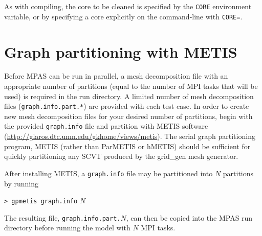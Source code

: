 As with compiling, the core to be cleaned is specified by the {\tt CORE} environment variable, or by specifying a core explicitly on the command-line with {\tt CORE=}.


\section{Graph partitioning with METIS} 
\label{sec:metis}


Before MPAS can be run in parallel, a mesh decomposition file with an appropriate number of 
partitions (equal to the number of MPI tasks that will be used) is required in the run directory.  A limited number of mesh decomposition files ({\tt graph.info.part.*}) are provided with each test case.  In order to create new mesh decomposition files for your desired number of partitions, begin with the provided {\tt graph.info} file and partition with METIS software (\url{http://glaros.dtc.umn.edu/gkhome/views/metis}). The serial graph partitioning program, METIS (rather than ParMETIS or hMETIS) should be sufficient for quickly partitioning any SCVT produced by the grid\_gen mesh generator.

After installing METIS, a {\tt graph.info} file may be partitioned into $N$ partitions by running

\vspace{12pt}
{\tt > gpmetis graph.info} $N$
\vspace{12pt}

\noindent The resulting file, {\tt graph.info.part.}$N$, can then be copied into the MPAS run directory
before running the model with $N$ MPI tasks.
